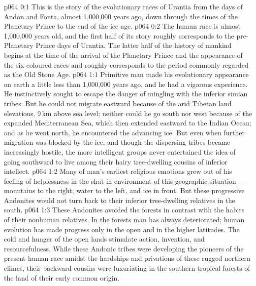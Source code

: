 \author{Life Carrier}
\vs p064 0:1 This is the story of the evolutionary races of Urantia from the days of Andon and Fonta, almost 1,000,000 years ago, down through the times of the Planetary Prince to the end of the ice age.
\vs p064 0:2 The human race is almost 1,000,000 years old, and the first half of its story roughly corresponds to the pre\hyp{}Planetary Prince days of Urantia. The latter half of the history of mankind begins at the time of the arrival of the Planetary Prince and the appearance of the six coloured races and roughly corresponds to the period commonly regarded as the Old Stone Age.
\vs p064 1:1 Primitive man made his evolutionary appearance on earth a little less than 1,000,000 years ago, and he had a vigorous experience. He instinctively sought to escape the danger of mingling with the inferior simian tribes. But he could not migrate eastward because of the arid Tibetan land elevations, 9\,km above sea level; neither could he go south nor west because of the expanded Mediterranean Sea, which then extended eastward to the Indian Ocean; and as he went north, he encountered the advancing ice. But even when further migration was blocked by the ice, and though the dispersing tribes became increasingly hostile, the more intelligent groups never entertained the idea of going southward to live among their hairy tree\hyp{}dwelling cousins of inferior intellect.
\vs p064 1:2 Many of man’s earliest religious emotions grew out of his feeling of helplessness in the shut\hyp{}in environment of this geographic situation --- mountains to the right, water to the left, and ice in front. But these progressive Andonites would not turn back to their inferior tree\hyp{}dwelling relatives in the south.
\vs p064 1:3 These Andonites avoided the forests in contrast with the habits of their nonhuman relatives. In the forests man has always deteriorated; human evolution has made progress only in the open and in the higher latitudes. The cold and hunger of the open lands stimulate action, invention, and resourcefulness. While these Andonic tribes were developing the pioneers of the present human race amidst the hardships and privations of these rugged northern climes, their backward cousins were luxuriating in the southern tropical forests of the land of their early common origin.
